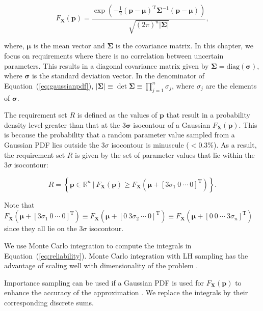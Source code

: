 \begin{equation} \label{eq:gaussianpdf}
	F_\mathbf{X}(\mathbf{p})={\frac {\exp \left(-{\frac {1}{2}}({\mathbf {p} }-{\boldsymbol {\mu }})^{\mathrm {T} }{\boldsymbol {\Sigma }}^{-1}({\mathbf {p} }-{\boldsymbol {\mu }})\right)}{\sqrt {(2\pi )^{n}|{\boldsymbol {\Sigma }}|}}},
\end{equation}

where, $\boldsymbol{\mu}$ is the mean vector and $\boldsymbol{\Sigma}$ is the covariance matrix. In this chapter, we focus on requirements where there is no correlation between uncertain parameters. This results in a diagonal covariance matrix given by $\boldsymbol{\Sigma} = \mathrm{diag}\left(\boldsymbol{\sigma}\right)$, where $\boldsymbol{\sigma}$ is the standard deviation vector. In the denominator of Equation~(\ref{eq:gaussianpdf}), $|{\boldsymbol {\Sigma }}|\equiv \det {\boldsymbol {\Sigma }} \equiv \prod\limits_{j=1}^{n} \sigma_j$, where $\sigma_j$ are the elements of $\boldsymbol{\sigma}$.

The requirement set $R$ is defined as the values of $\mathbf{p}$ that result in a probability density level greater than that at the $3 \boldsymbol{\sigma}$ isocontour of a Gaussian $F_\mathbf{X}(\mathbf{p})$. This is because the probability that a random parameter value sampled from a Gaussian \ac{PDF} lies outside the $3\sigma$ isocontour is minuscule ($<0.3\%$). As a result, the requirement set $R$ is given by the set of parameter values that lie within the $3\sigma$ isocontour:

\begin{equation} \label{eq:requirementsetgaussian}
	\textit{R} = \left\{\mathbf{p} \in \mathbb{R}^n~|~F_\mathbf{X}(\mathbf{p}) \geq F_\mathbf{X}(\boldsymbol{\mu} + \left[3\sigma_1~0~\cdots~0\right]^\mathrm{T}) \right\}.
\end{equation}

Note that $F_\mathbf{X}(\boldsymbol{\mu} + \left[3\sigma_1~0~\cdots~0\right]^\mathrm{T}) \equiv F_\mathbf{X}(\boldsymbol{\mu} + \left[0~3\sigma_2~\cdots~0\right]^\mathrm{T}) \equiv F_\mathbf{X}(\boldsymbol{\mu} + \left[0~0~\cdots~3\sigma_n\right]^\mathrm{T})$ since they all lie on the $3\sigma$ isocontour.

We use Monte Carlo integration to compute the integrals in Equation~(\ref{eq:reliability}). Monte Carlo integration with \acf{LH} sampling has the advantage of scaling well with dimensionality of the problem \cite{Magnusen1997,Zhang2016}.

Importance sampling can be used if a Gaussian \ac{PDF} is used for $F_\mathbf{X}(\mathbf{p})$ to enhance the accuracy of the approximation \cite{Frangopol2003a,ForouzandehShahraki2014,Kleiber2004}. We replace the integrals by their corresponding discrete sums.

